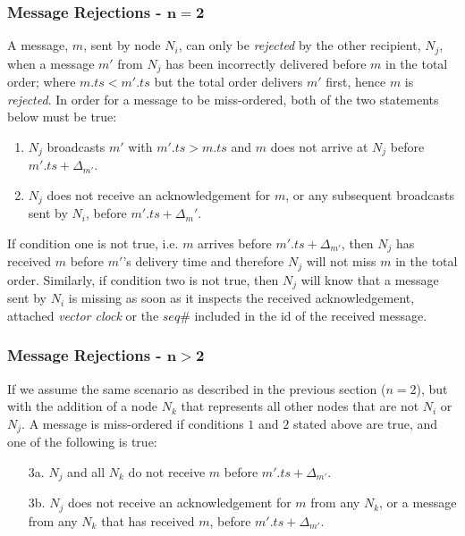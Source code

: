         \subsubsection*{Message Rejections - $\boldsymbol{n = 2}$}
        A message, $m$, sent by node $N_i$, can only be \emph{rejected} by the other recipient, $N_j$, when a message $m'$ from $N_j$ has been incorrectly delivered before $m$ in the total order; where $m.ts < m'.ts$ but the total order delivers $m'$ first, hence $m$ is \emph{rejected}.  In order for a message to be miss-ordered, both of the two statements below must be true:
        
        \begin{enumerate}
            \item $N_j$ broadcasts $m'$ with $m'.ts > m.ts$ and $m$ does not arrive at $N_j$ before $m'.ts + \Delta_{m'}$.  
            \item $N_j$ does not receive an acknowledgement for $m$, or any subsequent broadcasts sent by $N_i$, before $m'.ts + \Delta_m'$.   
        \end{enumerate}
        
        If condition one is not true, i.e. $m$ arrives before $m'.ts + \Delta_{m'}$, then $N_j$ has received $m$ before $m'$'s delivery time and therefore $N_j$ will not miss $m$ in the total order.  Similarly, if condition two is not true, then $N_j$ will know that a message sent by $N_i$ is missing as soon as it inspects the received acknowledgement, attached \emph{vector clock} or the $seq\#$ included in the id of the received message.  
        
        \subsubsection*{Message Rejections - $\boldsymbol{n > 2}$}
        If we assume the same scenario as described in the previous section ($n=2$), but with the addition of a node $N_k$ that represents all other nodes that are not $N_i$ or $N_j$.  A message is miss-ordered if conditions $1$ and $2$ stated above are true, and one of the following is true:
        
        \begin{itemize}
            \item[3a.] $N_j$ and all $N_k$ do not receive $m$ before $m'.ts + \Delta_{m'}$.
            
            \item[3b.] $N_j$ does not receive an acknowledgement for $m$ from any $N_k$, or a message from any $N_k$ that has received $m$, before $m'.ts + \Delta_{m'}$.  
        \end{itemize}
        
